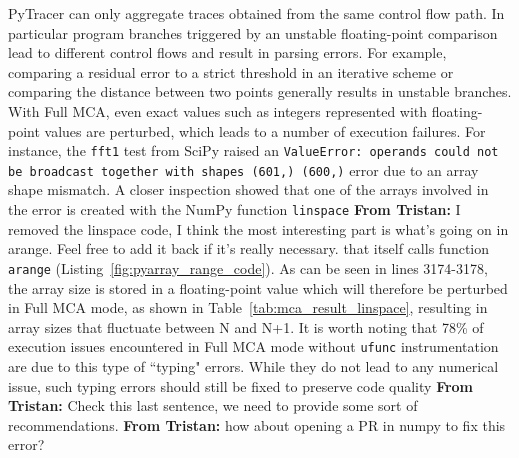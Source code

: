 \documentclass[11pt]{article}
\newcommand{\tristan}[1]{\color{orange}\textbf{From Tristan:} #1\color{black}\xspace}
\newcommand{\pytracer}[0]{PyTracer\xspace}
\begin{document}
\pytracer can only aggregate traces obtained from the same control flow path.
In particular program branches triggered by an unstable floating-point comparison 
lead to different control flows and result in parsing errors. 
For example, comparing a residual error to a strict threshold in an iterative scheme or comparing the distance between two points generally results in unstable branches. 
With Full MCA, even exact values such as integers represented with floating-point values are perturbed, which leads to a number of execution failures. For instance,  the \texttt{fft1} test from SciPy raised an \texttt{ValueError: operands could not be broadcast together with shapes (601,) (600,)} error due to an array shape mismatch. A closer inspection showed that one of the arrays involved in the error is created with the NumPy function \texttt{linspace} \tristan{I removed the linspace code, I think the most interesting part is what's going on in arange. Feel free to add it back if it's really necessary.} that itself calls function 
\texttt{arange} (Listing~\ref{fig:pyarray_range_code}). As can be seen in lines  3174-3178, the array size is stored in a floating-point value which will therefore be perturbed in Full MCA mode, as shown in Table~\ref{tab:mca_result_linspace}, resulting in array sizes that fluctuate
between N and N+1. 
It is worth noting that 78\% of execution issues encountered in Full MCA mode without \texttt{ufunc} instrumentation
are due to this type of ``typing" errors. While they do not lead to any numerical issue, such typing errors should still be fixed to preserve code quality \tristan{Check this last sentence, we need to provide some sort of recommendations}. \tristan{how about opening a PR in numpy to fix this error?}


\end{document}

